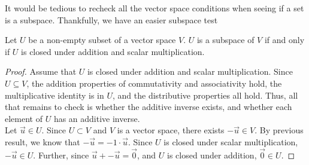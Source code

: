 It would be tedious to recheck all the vector space conditions when seeing if a set is a subspace.
Thankfully, we have an easier subspace test
\begin{theorem}
	Let $U$ be a non-empty subset of a vector space $V$.
	$U$ is a subspace of $V$ if and only if $U$ is closed under addition and scalar multiplication.
\end{theorem}
\begin{proof}
	Assume that $U$ is closed under addition and scalar multiplication.
	Since $U \subseteq V$, the addition properties of commutativity and associativity hold, the multiplicative identity is in $U$, and the distributive properties all hold.
	Thus, all that remains to check is whether the additive inverse exists, and whether each element of $U$ has an additive inverse. \\
	
	Let $\vec{u} \in U$.
	Since $U \subset V$ and $V$ is a vector space, there exists $-\vec{u} \in V$.
	By previous result, we know that $-\vec{u} = -1\cdot\vec{u}$.
	Since $U$ is closed under scalar multiplication, $-\vec{u} \in U$.
	Further, since $\vec{u} + -\vec{u} = \vec{0}$, and $U$ is closed under addition, $\vec{0} \in U$.
\end{proof}